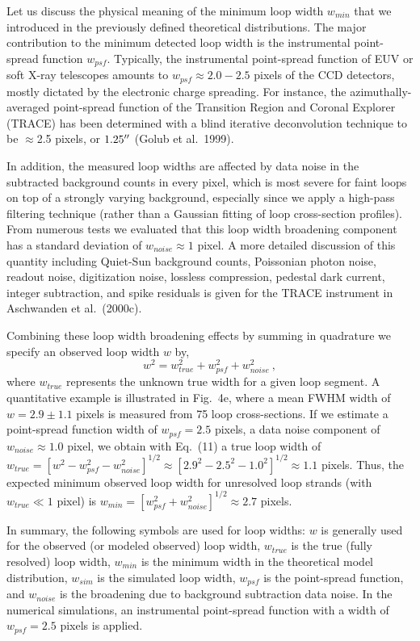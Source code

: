 \documentclass[10pt,preprint]{aastex}  %
\def\arcsec{\hbox{$^{\prime\prime}$}}
\begin{document}
Let us discuss the physical meaning of the minimum loop width 
$w_{min}$ that we introduced in the previously defined theoretical 
distributions. The major contribution to the minimum detected loop
width is the instrumental point-spread function $w_{psf}$.
Typically, the instrumental point-spread function of EUV or soft X-ray 
telescopes amounts to $w_{psf} \approx 2.0-2.5$ pixels of the CCD detectors, 
mostly dictated by the electronic charge spreading. For instance, the
azimuthally-averaged point-spread function of the Transition Region
and Coronal Explorer (TRACE) has been determined with a blind iterative 
deconvolution technique to be $\approx$2.5 pixels, or $1.25\arcsec$
(Golub et al.~1999). 

In addition, the measured loop widths are affected by data noise 
in the subtracted background counts in every pixel, which is most
severe for faint loops on top of a strongly varying background, especially
since we apply a high-pass filtering technique (rather than a
Gaussian fitting of loop cross-section profiles). From numerous
tests we evaluated that this loop width broadening component has
a standard deviation of $w_{noise} \approx 1$ pixel. A more detailed
discussion of this quantity including Quiet-Sun background counts,
Poissonian photon noise, readout noise, digitization noise,
lossless compression, pedestal dark current, integer subtraction,
and spike residuals is given for the TRACE instrument in 
Aschwanden et al.~(2000c).

Combining these loop width broadening effects by summing in quadrature
we specify an observed loop width $w$ by,
\begin{equation}
	w^2 = w_{true}^2 + w_{psf}^2 + w_{noise}^2 \ ,
\end{equation}
where $w_{true}$ represents the unknown true width for a given loop segment.
A quantitative example is illustrated in Fig.~4e, where a mean FWHM width 
of $w=2.9 \pm 1.1$ pixels is measured from 75 loop cross-sections. 
If we estimate a point-spread function width of $w_{psf}=2.5$ pixels, 
a data noise component of $w_{noise} \approx 1.0$ pixel, we obtain with
Eq.~(11) a true loop width of $w_{true}=
[w^2 - w_{psf}^2 - w_{noise}^2]^{1/2}
\approx [2.9^2 - 2.5^2 - 1.0^2]^{1/2} \approx 1.1$ pixels.
Thus, the expected minimum observed loop width 
for unresolved loop strands (with $w_{true} \ll 1$ pixel) is 
$w_{min} = [w_{psf}^2 + w_{noise}^2]^{1/2} \approx 2.7$ pixels.

In summary, the following symbols are used for loop widths:
$w$ is generally used for the observed (or modeled observed) loop width,
$w_{true}$ is the true (fully resolved) loop width,
$w_{min}$ is the minimum width in the theoretical model distribution,
$w_{sim}$ is the simulated loop width, 
$w_{psf}$ is the point-spread function, and 
$w_{noise}$ is the broadening due to background subtraction data noise.
In the numerical simulations, an instrumental point-spread
function with a width of $w_{psf}=2.5$ pixels is applied.
\end{document}
